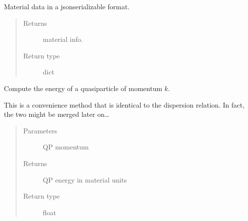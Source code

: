 \documentclass[letterpaper,10pt,english]{sphinxmanual}
\begin{document}
\begin{fulllineitems}
\begin{fulllineitems}
\end{fulllineitems}


\begin{fulllineitems}
\label{\detokenize{code_structure:scdc.material.Material.info}}
Material data in a json\sphinxhyphen{}serializable format.
\begin{quote}\begin{description}
\item[{Returns}] \leavevmode
material info.

\item[{Return type}] \leavevmode
dict

\end{description}\end{quote}

\end{fulllineitems}


\begin{fulllineitems}
\label{\detokenize{code_structure:scdc.material.Material.qpe}}
Compute the energy of a quasiparticle of momentum \(k\).

This is a convenience method that is identical to the 
dispersion relation. In fact, the two might be merged later on…
\begin{quote}\begin{description}
\item[{Parameters}] \leavevmode
{} \textendash{} QP momentum

\item[{Returns}] \leavevmode
QP energy in material units

\item[{Return type}] \leavevmode
float

\end{description}\end{quote}

\end{fulllineitems}


\end{fulllineitems}
\end{document}
